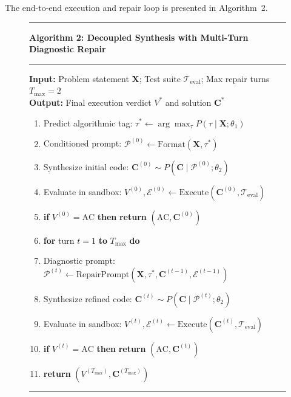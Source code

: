 \documentclass{ieeeaccess}
\begin{document}
The end-to-end execution and repair loop is presented in Algorithm~2.

\begin{figure}[!ht]
\centering
\begin{minipage}{0.98\columnwidth}
\hrule\vspace{3pt}
\textbf{Algorithm 2: Decoupled Synthesis with Multi-Turn Diagnostic Repair}
\vspace{2pt}\hrule\vspace{4pt}
\small
\textbf{Input:} Problem statement $\mathbf{X}$; Test suite $\mathcal{T}_{\text{eval}}$; Max repair turns $T_{\max}=2$\\
\textbf{Output:} Final execution verdict $V^*$ and solution $\mathbf{C}^*$
\begin{enumerate}
\itemsep=1.5pt
\item Predict algorithmic tag: $\tau^* \leftarrow \arg\max_\tau P(\tau \mid \mathbf{X}; \theta_1)$
\item Conditioned prompt: $\mathcal{P}^{(0)} \leftarrow \text{Format}(\mathbf{X}, \tau^*)$
\item Synthesize initial code: $\mathbf{C}^{(0)} \sim P(\mathbf{C} \mid \mathcal{P}^{(0)}; \theta_2)$
\item Evaluate in sandbox: $V^{(0)}, \mathcal{E}^{(0)} \leftarrow \text{Execute}(\mathbf{C}^{(0)}, \mathcal{T}_{\text{eval}})$
\item \textbf{if} $V^{(0)} = \text{AC}$ \textbf{then} \textbf{return} $(\text{AC}, \mathbf{C}^{(0)})$
\item \textbf{for} turn $t = 1$ \textbf{to} $T_{\max}$ \textbf{do}
\item \quad Diagnostic prompt: $\mathcal{P}^{(t)} \leftarrow \text{RepairPrompt}(\mathbf{X}, \tau^*, \mathbf{C}^{(t-1)}, \mathcal{E}^{(t-1)})$
\item \quad Synthesize refined code: $\mathbf{C}^{(t)} \sim P(\mathbf{C} \mid \mathcal{P}^{(t)}; \theta_2)$
\item \quad Evaluate in sandbox: $V^{(t)}, \mathcal{E}^{(t)} \leftarrow \text{Execute}(\mathbf{C}^{(t)}, \mathcal{T}_{\text{eval}})$
\item \quad \textbf{if} $V^{(t)} = \text{AC}$ \textbf{then} \textbf{return} $(\text{AC}, \mathbf{C}^{(t)})$
\item \textbf{return} $(V^{(T_{\max})}, \mathbf{C}^{(T_{\max})})$
\end{enumerate}
\vspace{2pt}\hrule
\end{minipage}
\end{figure}
\end{document}
